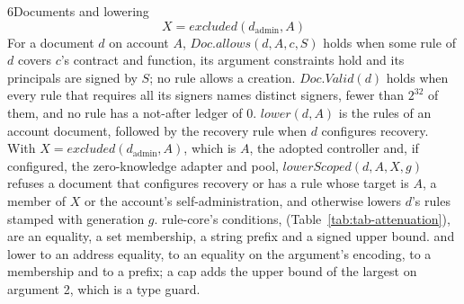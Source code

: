 \begin{perchdefinition}{6}{Documents and lowering}\label{def:documents-and-lowering}
\[X = \mathit{excluded}(d_{\mathrm{admin}}, A)\]
For a document \(d\) on account \(A\), \(\mathit{Doc.allows}(d, A, c, S)\) holds when some rule of \(d\) covers \(c\)'s contract and function, its argument constraints hold and its principals are signed by \(S\); no rule allows a creation. \(\mathit{Doc.Valid}(d)\) holds when every rule that requires all its signers names distinct signers, fewer than \(2^{32}\) of them, and no rule has a not-after ledger of 0. \(\mathit{lower}(d, A)\) is the rules of an account document, followed by the recovery rule when \(d\) configures recovery. With \(X = \mathit{excluded}(d_{\mathrm{admin}}, A)\), which is \(A\), the adopted controller and, if configured, the zero-knowledge adapter and pool, \(\mathit{lowerScoped}(d, A, X, g)\) refuses a document that configures recovery or has a rule whose target is \(A\), a member of \(X\) or the account's self-administration, and otherwise lowers \(d\)'s rules stamped with generation \(g\). rule-core's conditions,  (Table~\ref{tab:tab-attenuation}), are an equality, a set membership, a string prefix and a signed upper bound.  and  lower to an address equality,  to an equality on the argument's encoding,  to a membership and  to a prefix; a cap adds the upper bound of the largest  on argument 2, which is a type guard.
\end{perchdefinition}
